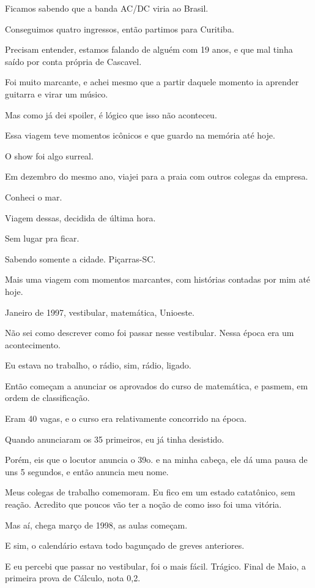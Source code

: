 Ficamos sabendo que a banda AC/DC viria ao Brasil. 

Conseguimos quatro ingressos, então partimos para Curitiba. 

Precisam entender, estamos falando de alguém com 19 anos, e que mal tinha saído por conta própria de Cascavel. 

Foi muito marcante, e achei mesmo que a partir daquele momento ia aprender guitarra e virar um músico. 

Mas como já dei spoiler, é lógico que isso não aconteceu. 

Essa viagem teve momentos icônicos e que guardo na memória até hoje. 

O show foi algo surreal.

Em dezembro do mesmo ano, viajei para a praia com outros colegas da empresa. 

Conheci o mar. 

Viagem dessas, decidida de última hora. 

Sem lugar pra ficar. 

Sabendo somente a cidade. Piçarras-SC.
 
Mais uma viagem com momentos marcantes, com histórias contadas por mim até hoje.

Janeiro de 1997, vestibular, matemática, Unioeste. 

Não sei como descrever como foi passar nesse vestibular. Nessa época era um acontecimento.

Eu estava no trabalho, o rádio, sim, rádio, ligado. 

Então começam a anunciar os aprovados do curso de matemática, e pasmem, em ordem de classificação. 

Eram 40 vagas, e o curso era relativamente concorrido na época. 

Quando anunciaram os 35 primeiros, eu já tinha desistido. 

Porém, eis que o locutor anuncia o 39o. e na minha cabeça, ele dá uma pausa de uns 5 segundos, e então anuncia meu nome. 

Meus colegas de trabalho comemoram. Eu fico em um estado catatônico, sem reação. Acredito que poucos vão ter a noção de como isso foi uma vitória.
	
Mas aí, chega março de 1998, as aulas começam. 

E sim, o calendário estava todo bagunçado de greves anteriores. 

E eu percebi que passar no vestibular, foi o mais fácil. Trágico. Final de Maio, a primeira prova de Cálculo, nota 0,2. 

